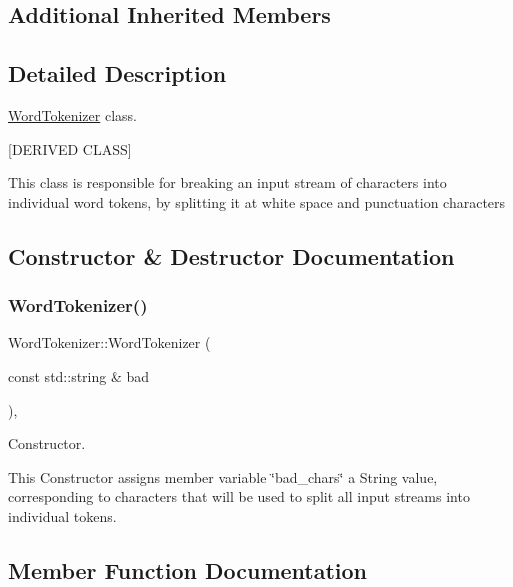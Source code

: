 \subsection*{Additional Inherited Members}


\subsection{Detailed Description}
\hyperlink{class_word_tokenizer}{Word\+Tokenizer} class. 

\mbox{[}D\+E\+R\+I\+V\+ED C\+L\+A\+SS\mbox{]}

This class is responsible for breaking an input stream of characters into individual word tokens, by splitting it at white space and punctuation characters 

\subsection{Constructor \& Destructor Documentation}
\mbox{\label{class_word_tokenizer_ad118d5de7f4e954b691f95aa5f8d514d}} 
\subsubsection{\texorpdfstring{Word\+Tokenizer()}{WordTokenizer()}}
{\footnotesize\ttfamily Word\+Tokenizer\+::\+Word\+Tokenizer (\begin{DoxyParamCaption}\item[{const std\+::string \&}]{bad }\end{DoxyParamCaption})\hspace{0.3cm}{\ttfamily [inline]}, {\ttfamily [explicit]}}



Constructor. 

This Constructor assigns member variable \char`\"{}bad\+\_\+chars\char`\"{} a String value, corresponding to characters that will be used to split all input streams into individual tokens. 

\subsection{Member Function Documentation}
\mbox{\label{class_word_tokenizer_a1148e1e01de56a7529a39a81a712e04c}} 
